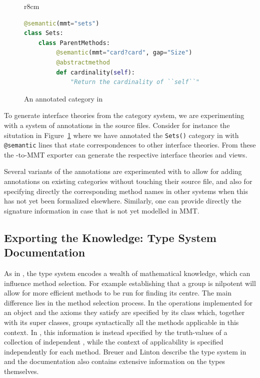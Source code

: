\begin{figure}r{8cm}\vspace*{-2.5em}
\begin{lstlisting}[language=Python]
@semantic(mmt="sets")
class Sets:
    class ParentMethods:
         @semantic(mmt="card?card", gap="Size")
         @abstractmethod
         def cardinality(self):
             "Return the cardinality of ``self``"
\end{lstlisting}
\vspace*{-.5em}
\caption{An annotated category in \Sage}\label{fig:anncat}\vspace*{-1.5em}
\end{figure}
To generate interface theories from the \Sage category system, we are experimenting with a
system of annotations in the \Sage source files. Consider for instance the situtation in
Figure~\ref{fig:anncat} where we have annotated the \texttt{Sets()} category in \Sage
with \texttt{@semantic} lines that state correspondences to other interface theories. From
these the \Sage-to-MMT exporter can generate the respective interface theories and views.

Several variants of the annotations are experimented with to allow for adding annotations on existing
categories without touching their source file, and also for specifying directly the corresponding
method names in other systems when this has not yet been formalized elsewhere. Similarly,
one can provide directly the signature information in case that is not yet modelled in
MMT.

\subsection{Exporting the \GAP Knowledge: Type System Documentation}
\label{sec:gaptypes}

As in \Sage, the \GAP type system encodes a wealth of mathematical
knowledge, which can influence method selection. For example
establishing that a group is nilpotent will allow for more efficient
methods to be run for finding its centre. The main difference lies in
the method selection process. In \Sage the operations
implemented for an object and the axioms they satisfy are specified by
its class which, together with its super classes, groups syntactically
all the methods applicable in this context. In \GAP, this information
is instead specified by the truth-values of a collection of
independent , while the context of applicability is
specified independently for each method.
%
Breuer and Linton describe the \GAP type system in \cite{breuer-linton} and
the \GAP documentation \cite{GAP4} also contains extensive information on the types
themselves.

